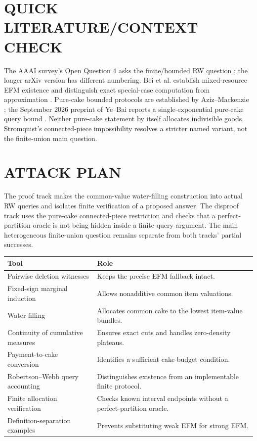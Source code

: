 \documentclass[11pt,a4paper]{article}
\theoremstyle{remark}\newtheorem{remark}[theorem]{Remark}
\begin{document}
\section{QUICK LITERATURE/CONTEXT CHECK}
The AAAI survey's Open Question 4 asks the finite/bounded RW question \cite{survey}; the longer arXiv version has different numbering. Bei et al. establish mixed-resource EFM existence and distinguish exact special-case computation from approximation \cite{bei}. Pure-cake bounded protocols are established by Aziz--Mackenzie \cite{am}; the September 2026 preprint of Ye--Bai reports a single-exponential pure-cake query bound \cite{yb}. Neither pure-cake statement by itself allocates indivisible goods. Stromquist's connected-piece impossibility \cite{strom} resolves a stricter named variant, not the finite-union main question.

\section{ATTACK PLAN}
The proof track makes the common-value water-filling construction into actual RW queries and isolates finite verification of a proposed answer. The disproof track uses the pure-cake connected-piece restriction and checks that a perfect-partition oracle is not being hidden inside a finite-query argument. The main heterogeneous finite-union question remains separate from both tracks' partial successes.

\begin{center}\begin{tabular}{p{.26\linewidth}p{.65\linewidth}}\toprule Tool&Role\\\midrule
Pairwise deletion witnesses&Keeps the precise EFM fallback intact.\\
Fixed-sign marginal induction&Allows nonadditive common item valuations.\\
Water filling&Allocates common cake to the lowest item-value bundles.\\
Continuity of cumulative measures&Ensures exact cuts and handles zero-density plateaus.\\
Payment-to-cake conversion&Identifies a sufficient cake-budget condition.\\
Robertson--Webb query accounting&Distinguishes existence from an implementable finite protocol.\\
Finite allocation verification&Checks known interval endpoints without a perfect-partition oracle.\\
Definition-separation examples&Prevents substituting weak EFM for strong EFM.\\\bottomrule\end{tabular}\end{center}
\end{document}
